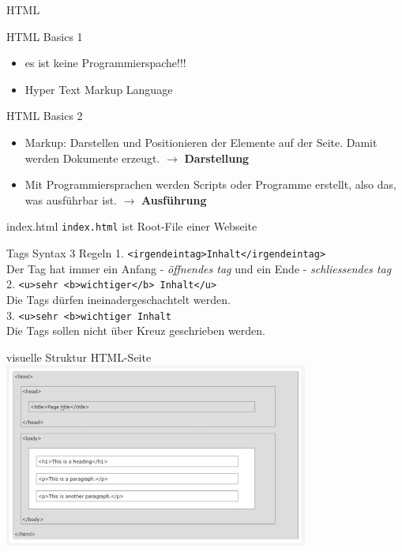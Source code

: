 \documentclass[12pt,xcolor={rgb}]{beamer}
\begin{document}
\begin{frame}{HTML}

\Huge{}
\end{frame}

\begin{frame}{HTML Basics 1}
\begin{itemize}
\item es ist keine Programmierspache!!!
\item Hyper Text Markup Language
\end{itemize}
\end{frame}

\begin{frame}{HTML Basics 2}
\begin{itemize}
\item Markup: Darstellen und Positionieren der Elemente auf der Seite. Damit werden Dokumente erzeugt. $\rightarrow$ \textbf{Darstellung}
\item Mit Programmiersprachen werden Scripts oder Programme erstellt, also das, was ausführbar ist. $\rightarrow$ \textbf{Ausführung}
\end{itemize}
\end{frame}


\begin{frame}{index.html}
\texttt{index.html} ist Root-File einer Webseite
\end{frame}

\begin{frame}{Tags Syntax 3 Regeln}
1. \large{\texttt{<irgendeintag>Inhalt</irgendeintag>}}\\
\footnotesize{Der Tag hat immer ein Anfang - \textit{öffnendes tag} und ein Ende - \textit{schliessendes tag}} \\\vspace{0.5cm}
2. \large{\texttt{<u>sehr <b>wichtiger</b> Inhalt</u>}}\\
\footnotesize{Die Tags dürfen ineinadergeschachtelt werden.}\\\vspace{0.5cm}
3. \large{\texttt{<u>sehr <b>wichtiger\color{red}{</u>} Inhalt \color{red}{</b>}}}\\
\footnotesize{Die Tags sollen nicht über Kreuz geschrieben werden.}
\end{frame}


\begin{frame}{visuelle Struktur HTML-Seite}
\includegraphics[width=10cm]{imgs/struk_vis.jpg}
\end{frame}
\end{document}
